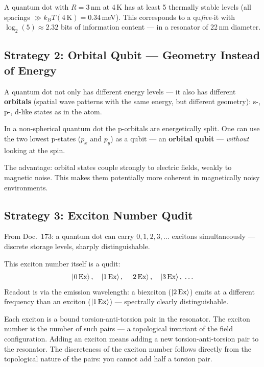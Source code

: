\begin{keyresult}
A quantum dot with $R = 3$\,nm at 4\,K
has at least 5 thermally stable levels
(all spacings $\gg k_BT(4\,\text{K}) = 0.34$\,meV).
This corresponds to a qu\textit{five}-it with
$\log_2(5) \approx 2.32$ bits of information content ---
in a resonator of 22\,nm diameter.
\end{keyresult}

\subsection{Strategy 2: Orbital Qubit --- Geometry Instead of Energy}
\label{sec:orbital}

A quantum dot not only has different energy levels ---
it also has different \textbf{orbitals} (spatial
wave patterns with the same energy, but different
geometry): s-, p-, d-like states as in the atom.

In a non-spherical quantum dot the
p-orbitals are energetically split.
One can use the two lowest p-states ($p_x$ and $p_y$)
as a qubit --- an \textbf{orbital qubit} ---
\emph{without} looking at the spin.

The advantage: orbital states couple strongly to electric
fields, weakly to magnetic noise.
This makes them potentially more coherent in magnetically
noisy environments.

\subsection{Strategy 3: Exciton Number Qudit}
\label{sec:exciton-qudit}

From Doc.~173: a quantum dot can carry $0, 1, 2, 3, \ldots$
excitons simultaneously --- discrete storage levels,
sharply distinguishable.

This exciton number itself is a qudit:
\[
  \left|0\,\text{Ex}\right\rangle,\quad
  \left|1\,\text{Ex}\right\rangle,\quad
  \left|2\,\text{Ex}\right\rangle,\quad
  \left|3\,\text{Ex}\right\rangle,\;\ldots
\]
Readout is via the emission wavelength:
a biexciton ($\left|2\,\text{Ex}\right\rangle$) emits at a
different frequency than an exciton ($\left|1\,\text{Ex}\right\rangle$)
--- spectrally clearly distinguishable.

\begin{foundation}
Each exciton is a bound torsion-anti-torsion pair
in the resonator. The exciton number is the
number of such pairs --- a topological invariant
of the field configuration.
Adding an exciton means adding a new torsion-anti-torsion pair
to the resonator. The discreteness of the exciton number
follows directly from the topological nature of the pairs:
you cannot add half a torsion pair.
\end{foundation}

